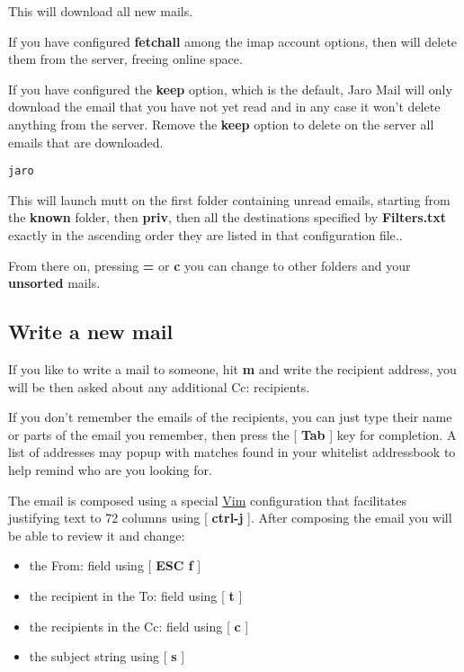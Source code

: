 \documentclass[a4,onecolumn,portrait]{article}
\begin{document}
This will download all new mails.

If you have configured \textbf{fetchall} among the imap account options, then
will delete them from the server, freeing online space.

If you have configured the \textbf{keep} option, which is the default, Jaro Mail will only download the email that you have not yet read and in any case it won't delete anything from the server. Remove the \textbf{keep} option to delete on the server all emails that are downloaded.

\begin{verbatim}
jaro
\end{verbatim}

This will launch mutt on the first folder containing unread emails, starting from the \textbf{known} folder, then \textbf{priv}, then all the destinations specified by \textbf{Filters.txt} exactly in the ascending order they are listed in that configuration file..

From there on, pressing \textbf{=} or \textbf{c} you can change to other folders and your \textbf{unsorted} mails.
\subsection{Write a new mail}
\label{sec-6-2}

If you like to write a mail to someone, hit \textbf{m} and write the recipient address, you will be then asked about any additional Cc: recipients.

If you don't remember the emails of the recipients, you can just type their name or parts of the email you remember, then press the [ \textbf{Tab} ]
key for completion. A list of addresses may popup with matches found in your whitelist addressbook to help remind who are you looking for.

The email is composed using a special \href{http://www.vim.org/}{Vim} configuration that facilitates justifying text to 72 columns using [ \textbf{ctrl-j} ]. After composing the email you will be able to review it and change:

\begin{itemize}
\item the From: field using [ \textbf{ESC f} ]
\item the recipient in the To: field using [ \textbf{t} ]
\item the recipients in the Cc: field using [ \textbf{c} ]
\item the subject string using [ \textbf{s} ]
\end{itemize}
\end{document}
